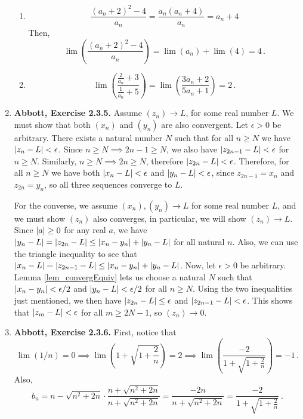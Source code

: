 \documentclass{article}
\DeclarePairedDelimiter\abs{\lvert}{\rvert}
\newcommand{\exc}[2][Abbott]{\item \textbf{#1, Exercise #2.}}
\begin{document}
\begin{enumerate}
\begin{enumerate}
		\item \begin{equation*}
		      \frac{(a_n+2)^2-4}{a_n} = \frac{a_n (a_n+4)}{a_n} = a_n + 4
		\end{equation*}
		Then, \begin{equation*}
		\lim (\frac{(a_n+2)^2-4}{a_n}) = \lim (a_n) + \lim(4) = 4 \, .
		\end{equation*}
							      		        
		\item \begin{equation*}
		      \lim(\frac{\frac{2}{a_n}+3}{\frac{1}{a_n}+5}) = \lim (\frac{3a_n + 2}{5a_n + 1}) = 2 \, .
		\end{equation*}
	\end{enumerate}
				      
	\exc{2.3.5}
	Assume $(z_n) \rightarrow L$, for some real number $L$. We must show that both $(x_n)$ and $(y_n)$ are also convergent. Let $\epsilon > 0$ be arbitrary. There exists a natural number $N$ such that for all $n \geq N$ we have $\abs{z_n - L} < \epsilon$. Since $n \geq N \implies 2n-1 \geq N$, we also have $\abs{z_{2n-1} - L} < \epsilon$ for $n \geq N$. Similarly, $n \geq N \implies 2n \geq N$, therefore $\abs{z_{2n}-L} < \epsilon$. Therefore, for all $n \geq N$ we have both $\abs{x_n - L} < \epsilon$ and $\abs{y_n - L} < \epsilon$, since $z_{2n-1} = x_n$ and $z_{2n} = y_n$, so all three sequences converge to $L$.
			        
	For the converse, we assume $(x_n), (y_n) \rightarrow L$ for some real number $L$, and we must show $(z_n)$ also converges, in particular, we will show $(z_n) \rightarrow L$. Since $\abs{a} \geq 0$ for any real $a$, we have $\abs{y_n-L} = \abs{z_{2n} - L} \leq \abs{x_n-y_n} + \abs{y_n-L}$ for all natural $n$. Also, we can use the triangle inequality to see that $\abs{x_n-L} = \abs{z_{2n-1}- L} \leq \abs{x_n-y_n} + \abs{y_n - L}$. Now, let $\epsilon > 0$ be arbitrary. Lemma \ref{lem_convergEquiv} lets us choose a natural $N$ such that $\abs{x_n-y_n} < \epsilon/2$ and $\abs{y_n-L} < \epsilon/2$ for all $n \geq N$. Using the two inequalities just mentioned, we then have $\abs{z_{2n} - L} \leq \epsilon$ and $\abs{z_{2n-1} - L} < \epsilon$. This shows that $\abs{z_m - L} < \epsilon$ for all $m \geq 2N-1$, so $(z_n) \rightarrow 0$.
			        
			        
	\exc{2.3.6}
	First, notice that
	\begin{equation*}
		\lim (1/n) = 0 \implies \lim(1+\sqrt{1+\frac{2}{n}}) = 2 \implies \lim (\frac{-2}{1+\sqrt{1+ \frac{2}{n}}}) = -1 \, .
	\end{equation*}
	Also, 
	\begin{equation*}
		b_n = n-\sqrt{n^2+2n} \cdot \frac{n+\sqrt{n^2+2n}}{n+\sqrt{n^2+2n}} = \frac{-2n}{n+\sqrt{n^2+2n}} = \frac{-2}{1+\sqrt{1+\frac{2}{n}}} ~ .
	\end{equation*}
			        

\end{enumerate}
\end{document}
